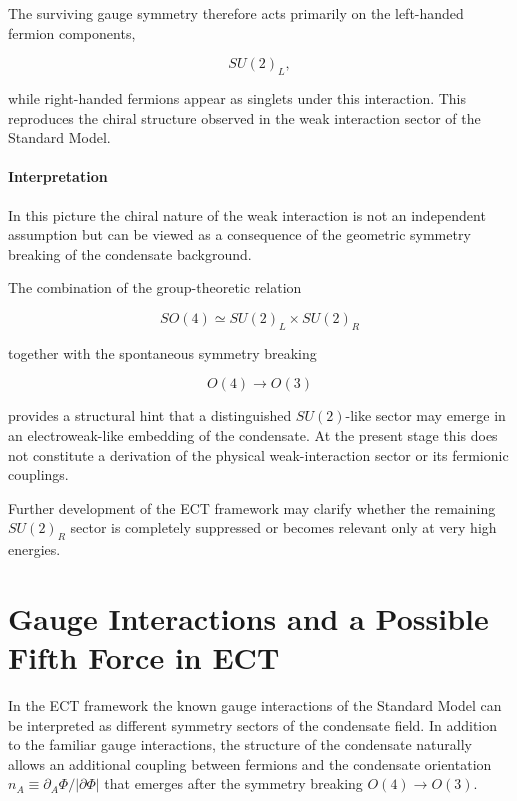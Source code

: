 \documentclass[11pt,a4paper]{article}
\numberwithin{equation}{section}
\begin{document}
The surviving gauge symmetry therefore acts primarily on the
left-handed fermion components,

\begin{equation}
SU(2)_L ,
\end{equation}

while right-handed fermions appear as singlets under this
interaction. This reproduces the chiral structure observed in the
weak interaction sector of the Standard Model.

\paragraph{Interpretation}

In this picture the chiral nature of the weak interaction is not an
independent assumption but can be viewed as a consequence of the
geometric symmetry breaking of the condensate background.

The combination of the group-theoretic relation

\begin{equation}
SO(4)\simeq SU(2)_L\times SU(2)_R
\end{equation}

together with the spontaneous symmetry breaking

\begin{equation}
O(4)\rightarrow O(3)
\end{equation}

provides a structural hint that a distinguished $SU(2)$-like sector
may emerge in an electroweak-like embedding of the condensate.
At the present stage this does not constitute a derivation of the
physical weak-interaction sector or its fermionic couplings.

Further development of the ECT framework may clarify whether the
remaining $SU(2)_R$ sector is completely suppressed or becomes
relevant only at very high energies.




\section{Gauge Interactions and a Possible Fifth Force in ECT}
\label{sec:fifth_force}

In the ECT framework the known gauge interactions of the Standard Model
can be interpreted as different symmetry sectors of the condensate
field.  In addition to the familiar gauge interactions, the structure
of the condensate naturally allows an additional coupling between
fermions and the condensate orientation $n_A \equiv \partial_A\Phi/|\partial\Phi|$
that emerges after the symmetry breaking $O(4)\rightarrow O(3)$.
\end{document}
